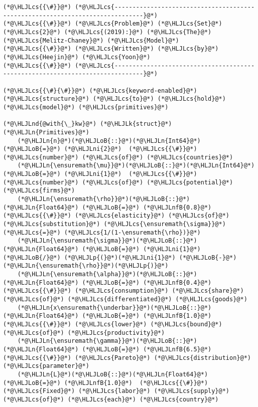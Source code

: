 \documentclass[12pt,a4paper]{article}
\newcommand{\HLJLk}[1]{\textcolor[RGB]{148,91,176}{\textbf{#1}}}
\newcommand{\HLJLn}[1]{#1}
\newcommand{\HLJLnd}[1]{\textcolor[RGB]{214,102,97}{#1}}
\newcommand{\HLJLnfB}[1]{\textcolor[RGB]{59,151,46}{#1}}
\newcommand{\HLJLni}[1]{\textcolor[RGB]{59,151,46}{#1}}
\newcommand{\HLJLoB}[1]{\textcolor[RGB]{102,102,102}{\textbf{#1}}}
\newcommand{\HLJLp}[1]{#1}
\newcommand{\HLJLcs}[1]{\textcolor[RGB]{153,153,119}{\textit{#1}}}
\begin{document}
\begin{lstlisting}
(*@\HLJLcs{{\#}}@*) (*@\HLJLcs{------------------------------------------------------------------------------}@*)
(*@\HLJLcs{{\#}}@*) (*@\HLJLcs{Problem}@*) (*@\HLJLcs{Set}@*) (*@\HLJLcs{2}@*) (*@\HLJLcs{(2019):}@*) (*@\HLJLcs{The}@*) (*@\HLJLcs{Melitz-Chaney}@*) (*@\HLJLcs{Model}@*)
(*@\HLJLcs{{\#}}@*) (*@\HLJLcs{Written}@*) (*@\HLJLcs{by}@*) (*@\HLJLcs{Heejin}@*) (*@\HLJLcs{Yoon}@*)
(*@\HLJLcs{{\#}}@*) (*@\HLJLcs{------------------------------------------------------------------------------}@*)

(*@\HLJLcs{{\#}{\#}}@*) (*@\HLJLcs{keyword-enabled}@*) (*@\HLJLcs{structure}@*) (*@\HLJLcs{to}@*) (*@\HLJLcs{hold}@*) (*@\HLJLcs{model}@*) (*@\HLJLcs{primitives}@*)

(*@\HLJLnd{@with{\_}kw}@*) (*@\HLJLk{struct}@*) (*@\HLJLn{Primitives}@*)
    (*@\HLJLn{n}@*)(*@\HLJLoB{::}@*)(*@\HLJLn{Int64}@*) (*@\HLJLoB{=}@*) (*@\HLJLni{2}@*)  (*@\HLJLcs{{\#}}@*) (*@\HLJLcs{number}@*) (*@\HLJLcs{of}@*) (*@\HLJLcs{countries}@*)
    (*@\HLJLn{\ensuremath{\mu}}@*)(*@\HLJLoB{::}@*)(*@\HLJLn{Int64}@*) (*@\HLJLoB{=}@*) (*@\HLJLni{1}@*)  (*@\HLJLcs{{\#}}@*) (*@\HLJLcs{number}@*) (*@\HLJLcs{of}@*) (*@\HLJLcs{potential}@*) (*@\HLJLcs{firms}@*)
    (*@\HLJLn{\ensuremath{\rho}}@*)(*@\HLJLoB{::}@*)(*@\HLJLn{Float64}@*) (*@\HLJLoB{=}@*) (*@\HLJLnfB{0.8}@*)  (*@\HLJLcs{{\#}}@*) (*@\HLJLcs{elasticity}@*) (*@\HLJLcs{of}@*) (*@\HLJLcs{substitution}@*) (*@\HLJLcs{\ensuremath{\sigma}}@*) (*@\HLJLcs{=}@*) (*@\HLJLcs{1/(1-\ensuremath{\rho})}@*)
    (*@\HLJLn{\ensuremath{\sigma}}@*)(*@\HLJLoB{::}@*)(*@\HLJLn{Float64}@*) (*@\HLJLoB{=}@*) (*@\HLJLni{1}@*) (*@\HLJLoB{/}@*) (*@\HLJLp{(}@*)(*@\HLJLni{1}@*) (*@\HLJLoB{-}@*) (*@\HLJLn{\ensuremath{\rho}}@*)(*@\HLJLp{)}@*)
    (*@\HLJLn{\ensuremath{\alpha}}@*)(*@\HLJLoB{::}@*)(*@\HLJLn{Float64}@*) (*@\HLJLoB{=}@*) (*@\HLJLnfB{0.4}@*)  (*@\HLJLcs{{\#}}@*) (*@\HLJLcs{consumption}@*) (*@\HLJLcs{share}@*) (*@\HLJLcs{of}@*) (*@\HLJLcs{differentiated}@*) (*@\HLJLcs{goods}@*)
    (*@\HLJLn{x\ensuremath{\underbar}}@*)(*@\HLJLoB{::}@*)(*@\HLJLn{Float64}@*) (*@\HLJLoB{=}@*) (*@\HLJLnfB{1.0}@*)  (*@\HLJLcs{{\#}}@*) (*@\HLJLcs{lower}@*) (*@\HLJLcs{bound}@*) (*@\HLJLcs{of}@*) (*@\HLJLcs{productivity}@*)
    (*@\HLJLn{\ensuremath{\gamma}}@*)(*@\HLJLoB{::}@*)(*@\HLJLn{Float64}@*) (*@\HLJLoB{=}@*) (*@\HLJLnfB{6.5}@*)  (*@\HLJLcs{{\#}}@*) (*@\HLJLcs{Pareto}@*) (*@\HLJLcs{distribution}@*) (*@\HLJLcs{parameter}@*)
    (*@\HLJLn{L}@*)(*@\HLJLoB{::}@*)(*@\HLJLn{Float64}@*) (*@\HLJLoB{=}@*) (*@\HLJLnfB{1.0}@*)  (*@\HLJLcs{{\#}}@*) (*@\HLJLcs{Fixed}@*) (*@\HLJLcs{labor}@*) (*@\HLJLcs{supply}@*) (*@\HLJLcs{of}@*) (*@\HLJLcs{each}@*) (*@\HLJLcs{country}@*)

\end{lstlisting}
\end{document}
